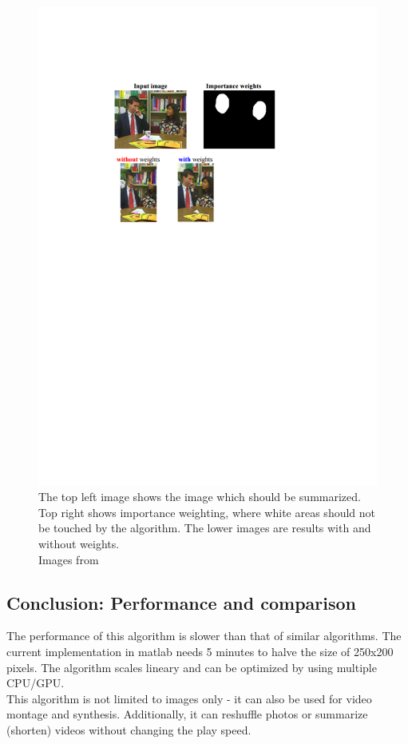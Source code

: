 \begin{figure}[h]
\centering
\includegraphics[scale=0.8]{img/importance_weights}
\caption[Importance weights]{The top left image shows the image which should be summarized. Top right shows importance weighting, where white areas should not be touched by the algorithm. The lower images are results with and without weights.\\ Images from \cite{bisi}}
\label{fig:Importance_weights}
\end{figure}

\subsection{Conclusion: Performance and comparison}
The performance of this algorithm is slower than that of similar algorithms. The current implementation in matlab needs 5 minutes to halve the size of 250x200 pixels\footnotemark. The algorithm scales lineary and can be optimized by using multiple CPU/GPU. \cite{bisi}\\
This algorithm is not limited to images only - it can also be used for video montage and synthesis. Additionally, it can reshuffle photos or summarize (shorten) videos without changing the play speed.

